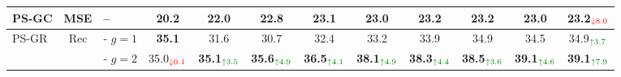 \begin{table}[t]
\begin{minipage}[t]{1.0\linewidth}
{{\begin{tabular}{l c l | c c c c c c c c | c}
            \textsc{PS-GC} & MSE & \scriptsize{--} & 20.2 & 22.0 & 22.8 & 23.1 & 23.0 & 23.2 & 23.2 & 23.0 & 23.2$_{\textcolor{red}{\downarrow 8.0}}$ \\
            \midrule
            
            \multirow{2}{*}{\textsc{PS-GR}} & \multirow{2}{*}{Rec} & \scriptsize{- $g=1$} & \textbf{35.1} & 31.6 & 30.7 & 32.4 & 33.2 & 33.9 & 34.9 & 34.5 & 34.9$_{\textcolor{darkgreen}{\uparrow 3.7}}$ \\
             & & \scriptsize{- $g=2$} & 35.0$_{\textcolor{red}{\downarrow 0.1}}$ & \textbf{35.1}$_{\textcolor{darkgreen}{\uparrow 3.5}}$ & \textbf{35.6}$_{\textcolor{darkgreen}{\uparrow 4.9}}$ & \textbf{36.5}$_{\textcolor{darkgreen}{\uparrow 4.1}}$ & \textbf{38.1}$_{\textcolor{darkgreen}{\uparrow 4.9}}$ & \textbf{38.3}$_{\textcolor{darkgreen}{\uparrow 4.4}}$ & \textbf{38.5}$_{\textcolor{darkgreen}{\uparrow 3.6}}$ & \textbf{39.1}$_{\textcolor{darkgreen}{\uparrow 4.6}}$ & \textbf{39.1}$_{\textcolor{darkgreen}{\uparrow 7.9}}$ \\
            
            \bottomrule
        \end{tabular}
    }
    }
\end{minipage}

\end{table}